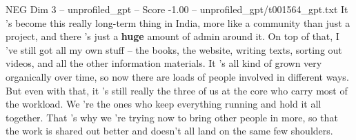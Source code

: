 \begin{textsample}{NEG Dim 3 – unprofiled\_gpt – Score -1.00 – unprofiled\_gpt/t001564\_gpt.txt}  \label{ex:f3_neg_020}
It 's become this really long-term thing in India, more like a community than just a project, and there ’s just a \textbf{huge} amount of admin around it.
On top of that, I ’ve still got all my own stuff – the books, the website, writing texts, sorting out videos, and all the other information materials.
It ’s all kind of grown very organically over time, so now there are loads of people involved in different ways.
But even with that, it ’s still really the three of us at the core who carry most of the workload.
We ’re the ones who keep everything running and hold it all together.
That ’s why we ’re trying now to bring other people in more, so that the work is shared out better and doesn't all land on the same few shoulders.

\end{textsample}
